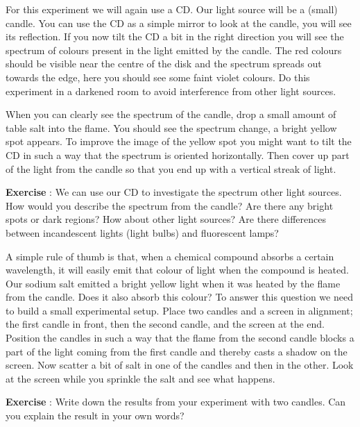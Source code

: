 \documentclass[12pt,a4paper]{article}
\numberwithin{equation}{section}
\numberwithin{figure}{section}
\newcounter{Exercise}
\numberwithin{table}{section}
\begin{document}
For this experiment we will again use a CD. Our light source will be a (small) candle. You can use the CD as a simple mirror to look at the candle, you will see its reflection. If you now tilt the CD a bit in the right direction you will see the spectrum of colours present in the light emitted by the candle. The red colours should be visible near the centre of the disk and the spectrum spreads out towards the edge, here you should see some faint violet colours. Do this experiment in a darkened room to avoid interference from other light sources.

When you can clearly see the spectrum of the candle, drop a small amount of table salt into the flame. You should see the spectrum change, a bright yellow spot appears. To improve the image of the yellow spot you might want to tilt the CD in such a way that the spectrum is oriented horizontally. Then cover up part of the light from the candle so that you end up with a vertical streak of light.

\begin{shaded}
\textbf{Exercise \theExercise {}} : We can use our CD to investigate the spectrum other light sources. How would you describe the spectrum from the candle? Are there any bright spots or dark regions? How about other light sources? Are there differences between incandescent lights (light bulbs) and fluorescent lamps? \end{shaded}

A simple rule of thumb is that, when a chemical compound absorbs a certain wavelength, it will easily emit that colour of light when the compound is heated. Our sodium salt emitted a bright yellow light when it was heated by the flame from the candle. Does it also absorb this colour? To answer this question we need to build a small experimental setup. Place two candles and a screen in alignment; the first candle in front, then the second candle, and the screen at the end. Position the candles in such a way that the flame from the second candle blocks a part of the light coming from the first candle and thereby casts a shadow on the screen. Now scatter a bit of salt in one of the candles and then in the other. Look at the screen while you sprinkle the salt and see what happens.
\begin{shaded}
\textbf{Exercise \theExercise {}} : Write down the results from your experiment with two candles. Can you explain the result in your own words?\end{shaded}
\end{document}
